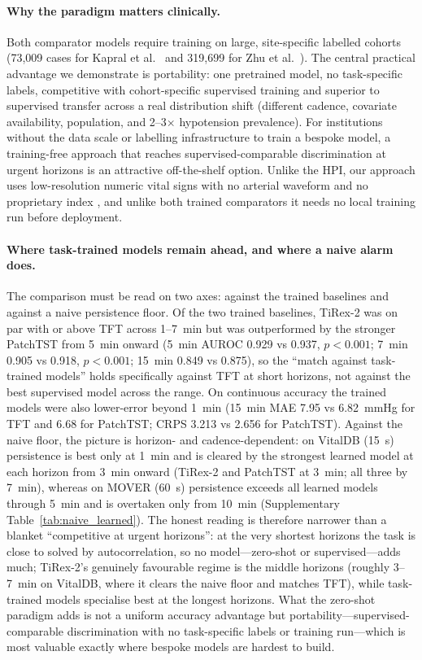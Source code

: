 \documentclass[11pt]{article}
\begin{document}
\paragraph{Why the paradigm matters clinically.} Both comparator models require training
on large, site-specific labelled cohorts (73{,}009 cases for Kapral et al.\
\citep{Kapral2024} and 319{,}699 for Zhu et al.\ \citep{Zhu2026}). The
central practical advantage we demonstrate is portability: one pretrained
model, no task-specific labels, competitive with cohort-specific supervised
training and superior to supervised transfer across a real distribution
shift (different cadence, covariate availability, population, and
2--3$\times$ hypotension prevalence). For institutions without the data
scale or labelling infrastructure to train a bespoke model, a training-free
approach that reaches supervised-comparable discrimination at urgent
horizons is an attractive off-the-shelf option. Unlike the HPI, our approach
uses low-resolution numeric vital signs with no arterial waveform and no
proprietary index \citep{Hatib2018,Enevoldsen2022,Vistisen2024}, and unlike
both trained comparators it needs no local training run before deployment.

\paragraph{Where task-trained models remain ahead, and where a naive alarm
does.} The comparison must be read on two axes: against the trained baselines
and against a naive persistence floor. Of the two trained baselines, TiRex-2
was on par with or above TFT across 1--7~min but was outperformed by the stronger PatchTST from
5~min onward (5~min AUROC 0.929 vs 0.937, $p<0.001$; 7~min 0.905 vs 0.918,
$p<0.001$; 15~min 0.849 vs 0.875), so the ``match against task-trained
models'' holds specifically against TFT at short horizons, not against the
best supervised model across the range. On continuous accuracy the trained
models were also lower-error beyond 1~min (15~min MAE 7.95 vs 6.82~mmHg for
TFT and 6.68 for PatchTST; CRPS 3.213 vs 2.656 for PatchTST). Against the
naive floor, the picture is horizon- and cadence-dependent: on VitalDB
(15~s) persistence is best only at 1~min and is cleared by the strongest
learned model at each horizon from 3~min onward (TiRex-2 and PatchTST at
3~min; all three by 7~min), whereas on MOVER (60~s) persistence exceeds all
learned models through 5~min and is overtaken only from 10~min (Supplementary
Table~\ref{tab:naive_learned}). The honest reading is therefore narrower than
a blanket ``competitive at urgent horizons'': at the very shortest horizons
the task is close to solved by autocorrelation, so no model---zero-shot or
supervised---adds much; TiRex-2's genuinely favourable regime is the middle
horizons (roughly 3--7~min on VitalDB, where it clears the naive floor and
matches TFT), while task-trained models specialise best at the longest
horizons. What the zero-shot paradigm adds is not a uniform accuracy
advantage but portability---supervised-comparable discrimination with no
task-specific labels or training run---which is most valuable exactly where
bespoke models are hardest to build.
\end{document}
